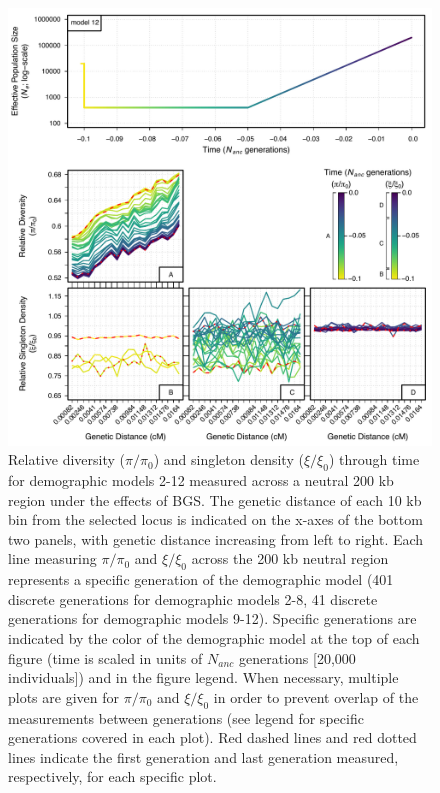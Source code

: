 \documentclass[9pt,twocolumn,twoside]{rilabRxiv}
\begin{document}
\begin{figure}[htb]
      \centering
      \includegraphics[width=\linewidth]{figures/FigS20.pdf}
      \caption{Relative diversity ($\pi/\pi_0$) and singleton density ($\xi/\xi_0$) through time for demographic models 2-12 measured across a neutral 200 kb region under the effects of BGS.
The genetic distance of each 10 kb bin from the selected locus is indicated on the x-axes of the bottom two panels, with genetic distance increasing from left to right.
Each line measuring $\pi/\pi_0$ and $\xi/\xi_0$ across the 200 kb neutral region represents a specific generation of the demographic model (401 discrete generations for demographic models 2-8, 41 discrete generations for demographic models 9-12).
Specific generations are indicated by the color of the demographic model at the top of each figure (time is scaled in units of $N_{anc}$ generations [20,000 individuals]) and in the figure legend.
When necessary, multiple plots are given for $\pi/\pi_0$ and $\xi/\xi_0$ in order to prevent overlap of the measurements between generations (see legend for specific generations covered in each plot).
Red dashed lines and red dotted lines indicate the first generation and last generation measured, respectively, for each specific plot.}
\label{fig:all200}
\end{figure}
\pagebreak
\end{document}
